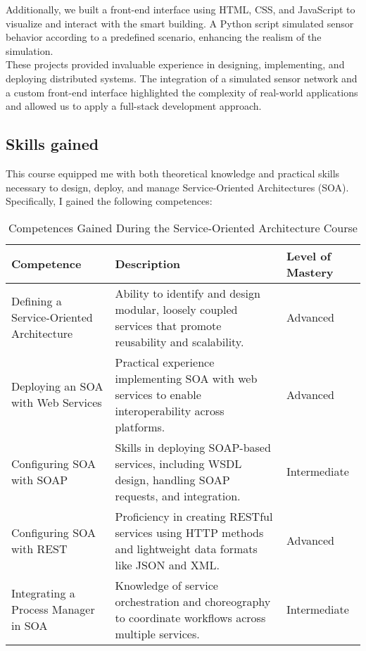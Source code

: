 Additionally, we built a front-end interface using HTML, CSS, and JavaScript to visualize and interact with the smart building. A Python script simulated sensor behavior according to a predefined scenario, enhancing the realism of the simulation.
\\
These projects provided invaluable experience in designing, implementing, and deploying distributed systems. The integration of a simulated sensor network and a custom front-end interface highlighted the complexity of real-world applications and allowed us to apply a full-stack development approach.

\subsection{Skills gained}
This course equipped me with both theoretical knowledge and practical skills necessary to design, deploy, and manage Service-Oriented Architectures (SOA). Specifically, I gained the following competences:

\begin{table}[h!]
    \centering
    \begin{tabular}{|p{3.5cm}|p{8cm}|p{3.5cm}|}
    \hline
    \textbf{Competence} & \textbf{Description} & \textbf{Level of Mastery} \\ \hline
    Defining a Service-Oriented Architecture & Ability to identify and design modular, loosely coupled services that promote reusability and scalability. & Advanced \\ \hline
    Deploying an SOA with Web Services       & Practical experience implementing SOA with web services to enable interoperability across platforms. & Advanced \\ \hline
    Configuring SOA with SOAP                & Skills in deploying SOAP-based services, including WSDL design, handling SOAP requests, and integration. & Intermediate \\ \hline
    Configuring SOA with REST                & Proficiency in creating RESTful services using HTTP methods and lightweight data formats like JSON and XML. & Advanced \\ \hline
    Integrating a Process Manager in SOA     & Knowledge of service orchestration and choreography to coordinate workflows across multiple services. & Intermediate \\ \hline
    \end{tabular}
    \caption{Competences Gained During the Service-Oriented Architecture Course}
\end{table}

